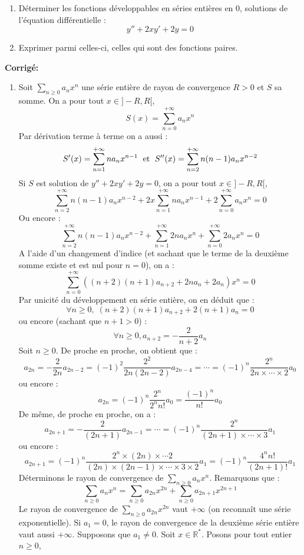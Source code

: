 \documentclass[a4paper,twoside,french,11pt]{VcCours}
\newcommand{\Sum}[2]{\sum_{#1}^{#2}}
\newcommand{\corr}{\textbf{Corrigé:}}
\begin{document}
\begin{Exercice}{} \begin{enumerate}
  \item Déterminer les fonctions développables en séries entières en $0$, solutions de l'équation différentielle :
    \[
    y'' + 2xy' + 2y = 0
    \]
  \item Exprimer parmi celles-ci, celles qui sont des fonctions paires.
  \end{enumerate}
\end{Exercice} 

\newpage

\corr 
\begin{enumerate}
\item Soit $\Sum{n \geq 0}{} a_n x^n$ une série entière de rayon de convergence $R>0$ et $S$ sa somme. On a pour tout $x \in ]-R,R[$,
$$ S(x) = \sum_{n=0}^{+ \infty} a_n x^n$$
Par dérivation terme à terme on a aussi :
$$ S'(x) = \sum_{n=1}^{+ \infty} n a_n x^{n-1} \; \hbox{ et } \; S''(x) = \sum_{n=2}^{+ \infty} n(n-1) a_n x^{n-2}$$
Si $S$ est solution de $y'' + 2xy' + 2y = 0$, on a pour tout $x \in ]-R,R[$,
$$ \sum_{n=2}^{+ \infty} n(n-1) a_n x^{n-2} + 2x \sum_{n=1}^{+ \infty} n a_n x^{n-1} + 2\sum_{n=0}^{+ \infty} a_n x^n = 0$$
Ou encore :
$$ \sum_{n=2}^{+ \infty} n(n-1) a_n x^{n-2} +  \sum_{n=1}^{+ \infty} 2n a_n x^{n} + \sum_{n=0}^{+ \infty} 2a_n x^n = 0$$
A l'aide d'un changement d'indice (et sachant que le terme de la deuxième somme existe et est nul pour $n=0$), on a :
$$ \sum_{n=0}^{+ \infty}  ((n+2)(n+1) a_{n+2} + 2n a_n + 2a_n)x^n = 0$$
Par unicité du développement en série entière, on en déduit que :
$$ \forall n \geq 0, \; (n+2)(n+1) a_{n+2} + 2(n+1) a_n =0$$
ou encore (sachant que $n+1>0$) :
$$ \forall n \geq 0, a_{n+2} = -\dfrac{2}{n+2} a_n $$
Soit $n \geq 0$. De proche en proche, on obtient que :
$$ a_{2n} = - \dfrac{2}{2n} a_{2n-2} = (-1)^2 \dfrac{2^2}{2n(2n-2)} a_{2n-4} = \cdots = (-1)^n \dfrac{2^n}{2n \times \cdots \times 2} a_0$$
ou encore :
$$ a_{2n} = (-1)^n \dfrac{2^n}{2^n n!} a_0 = \dfrac{(-1)^n}{n!} a_0 $$
De même, de proche en proche, on a :
$$ a_{2n+1} = - \dfrac{2}{(2n+1)} a_{2n-1} = \cdots = (-1)^n \dfrac{2^n}{(2n+1) \times \cdots \times 3} a_1$$
ou encore :
$$ a_{2n+1} = (-1)^n \dfrac{2^n \times (2n) \times \cdots 2}{(2n) \times(2n-1) \times \cdots \times 3 \times 2} a_1 = (-1)^n \dfrac{4^n n!}{(2n+1)!} a_1$$
Déterminons le rayon de convergence de $\Sum{n \geq 0}{} a_n x^n$. Remarquons que :
$$ \sum_{n \geq 0} a_n x^n = \sum_{n \geq 0} a_{2n} x^{2n} + \sum_{n \geq 0} a_{2n+1} x^{2n+1}$$
Le rayon de convergence de $\Sum{n \geq 0}{} a_{2n} x^{2n}$ vaut $+ \infty$ (on reconnaît une série exponentielle). Si $a_1=0$, le rayon de convergence de la deuxième série entière vaut aussi $+ \infty$. Supposons que $a_1 \neq 0$. Soit $x \in \mathbb{R}^*$. Posons pour tout entier $n \geq 0$,

\end{enumerate}
\end{document}
